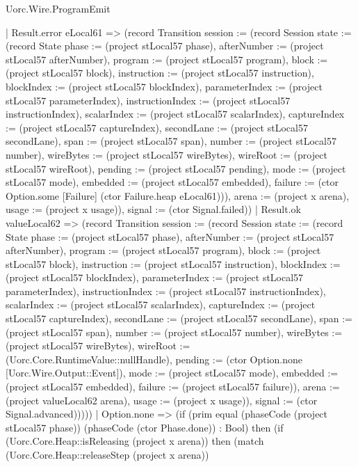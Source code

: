 \begin{lexlean}{Uorc.Wire.ProgramEmit}
\begin{semanticmodule}
{      | Result.error eLocal61 => (record Transition {session := (record Session {state := (record State {phase := (project stLocal57 phase), afterNumber := (project stLocal57 afterNumber), program := (project stLocal57 program), block := (project stLocal57 block), instruction := (project stLocal57 instruction), blockIndex := (project stLocal57 blockIndex), parameterIndex := (project stLocal57 parameterIndex), instructionIndex := (project stLocal57 instructionIndex), scalarIndex := (project stLocal57 scalarIndex), captureIndex := (project stLocal57 captureIndex), secondLane := (project stLocal57 secondLane), span := (project stLocal57 span), number := (project stLocal57 number), wireBytes := (project stLocal57 wireBytes), wireRoot := (project stLocal57 wireRoot), pending := (project stLocal57 pending), mode := (project stLocal57 mode), embedded := (project stLocal57 embedded), failure := (ctor Option.some [Failure] (ctor Failure.heap eLocal61))}), arena := (project x arena), usage := (project x usage)}), signal := (ctor Signal.failed)})
      | Result.ok valueLocal62 => (record Transition {session := (record Session {state := (record State {phase := (project stLocal57 phase), afterNumber := (project stLocal57 afterNumber), program := (project stLocal57 program), block := (project stLocal57 block), instruction := (project stLocal57 instruction), blockIndex := (project stLocal57 blockIndex), parameterIndex := (project stLocal57 parameterIndex), instructionIndex := (project stLocal57 instructionIndex), scalarIndex := (project stLocal57 scalarIndex), captureIndex := (project stLocal57 captureIndex), secondLane := (project stLocal57 secondLane), span := (project stLocal57 span), number := (project stLocal57 number), wireBytes := (project stLocal57 wireBytes), wireRoot := (Uorc.Core.RuntimeValue::nullHandle), pending := (ctor Option.none [Uorc.Wire.Output::Event]), mode := (project stLocal57 mode), embedded := (project stLocal57 embedded), failure := (project stLocal57 failure)}), arena := (project valueLocal62 arena), usage := (project x usage)}), signal := (ctor Signal.advanced)}))))
    | Option.none => (if (prim equal (phaseCode (project stLocal57 phase)) (phaseCode (ctor Phase.done)) : Bool) then (if (Uorc.Core.Heap::isReleasing (project x arena)) then (match (Uorc.Core.Heap::releaseStep (project x arena))
}
\end{semanticmodule}
\end{lexlean}
